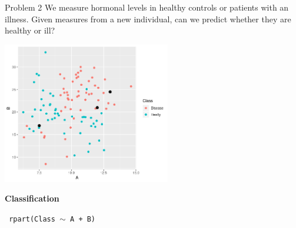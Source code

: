 \documentclass[9pt]{beamer}
\begin{document}
\begin{frame}
{Problem 2}
We measure hormonal levels in healthy controls or patients with an illness. Given measures from a new individual, can we predict whether they are healthy or ill?

\begin{overprint}
\centering \includegraphics[width=0.55\textwidth]{Problem2.png}
\end{overprint}
\centering \textbf{Classification}

\begin{codebox}
\texttt{	rpart(Class $\sim$ A + B)}
\end{codebox}

\end{frame}
\end{document}
